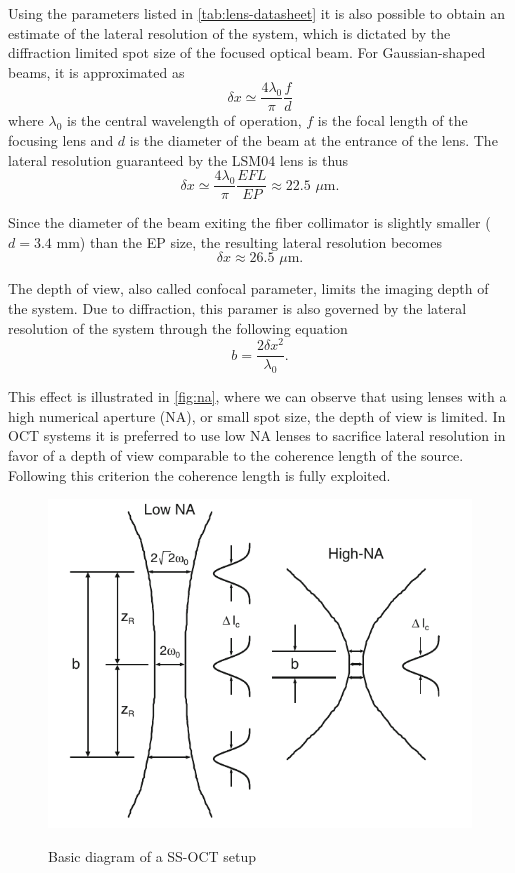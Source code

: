  Using the parameters listed in \autoref{tab:lens-datasheet} it is also possible to obtain an estimate of the lateral resolution of the system, which is dictated by the diffraction limited spot size of the focused optical beam. For Gaussian-shaped beams, it is approximated as \cite{Drexler2015}
 \begin{equation}
 	\delta x \simeq \frac{4\lambda_0}{\pi} \frac{f}{d}
 \end{equation}
 where $\lambda_0$ is the central wavelength of operation, $f$ is the focal length of the focusing lens and $d$ is the diameter of the beam at the entrance of the lens. The lateral resolution guaranteed by the LSM04 lens is thus
 \begin{equation}
 	\delta x \simeq \frac{4\lambda_0}{\pi} \frac{EFL}{EP} \approx 22.5 \,\,\mu\text{m.}
 \end{equation}
 
 Since the diameter of the beam exiting the fiber collimator is slightly smaller ($d=3.4$ mm) than the EP size, the resulting lateral resolution becomes
 \begin{equation}
	\delta x \approx 26.5 \,\,\mu\text{m}.
 \end{equation}
 
 The depth of view, also called confocal parameter, limits the imaging depth of the system. Due to diffraction, this paramer is also governed by the lateral resolution of the system through the following equation
 \begin{equation}
	 b = \frac{2 \delta x^2}{\lambda_0}.
 \end{equation}
 
 This effect is illustrated in \autoref{fig:na}, where we can observe that using lenses with a high numerical aperture (NA), or small spot size, the depth of view is limited. In OCT systems it is preferred to use low NA lenses to sacrifice lateral resolution in favor of a depth of view comparable to the coherence length of the source. Following this criterion the coherence length is fully exploited. 
 
  \begin{figure}[bth]
 	\myfloatalign
 	{\includegraphics[width=0.6\linewidth]{gfx/ch3/na}}
 	\caption{Basic diagram of a  SS-OCT setup}\label{fig:na}
 \end{figure}
 
